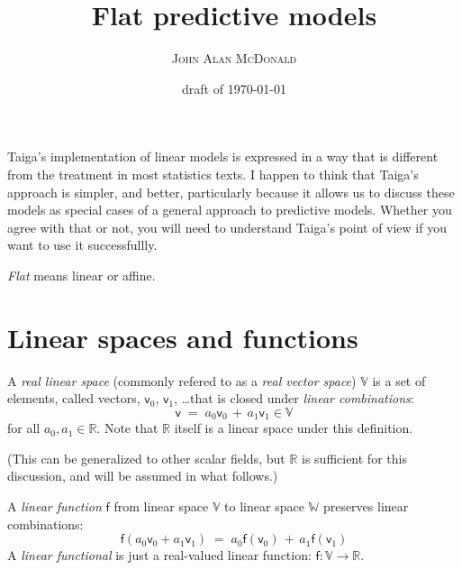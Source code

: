 



\title{Flat predictive models}
\author{\textsc{John Alan McDonald }}
\date{draft of \today}

\maketitle

Taiga's implementation of linear models is expressed in a way
that is different from the treatment in most statistics texts.
I happen to think that Taiga's approach is simpler, and better, 
particularly because it allows us to discuss these models as
special cases of a general approach to predictive models.
Whether you agree with that or not, you will need to understand
Taiga's point of view if you want to use it successfullly.

\textit{Flat} means linear or affine.

\section{\label{sec:Linear} Linear spaces and functions}

A \textit{real linear space} 
(commonly refered to as a
\textit{real vector space}) 
\(\mathbb{V}\) is a set of elements, called vectors,
\(\mathsf{v}_0\), \(\mathsf{v}_1\), \ldots that is closed under 
\textit{linear combinations}:
\begin{equation}
\mathsf{v} \; = \; a_0 \mathsf{v}_0 \, + \, a_1 \mathsf{v}_1 
\in \mathbb{V}
\end{equation}
for all \(a_0, a_1 \in \mathbb{R}\).
Note that \(\mathbb{R}\) itself is a linear space under this
definition.

(This can be generalized to other scalar fields,
but \(\mathbb{R}\) is sufficient for this discussion,
and will be assumed in what follows.)

A \textit{linear function} \(\mathsf{f}\) from linear space
\(\mathbb{V}\) to linear space \(\mathbb{W}\) 
preserves linear combinations:
\begin{equation}
\mathsf{f}(a_0 \mathsf{v}_0 + a_1 \mathsf{v}_1 ) 
\; = \;
a_0 \mathsf{f}(\mathsf{v}_0) \, + \, 
a_1 \mathsf{f}(\mathsf{v}_1)
\end{equation}
A \textit{linear functional} is just a real-valued linear
function: \(\mathsf{f} : \mathbb{V} \rightarrow \mathbb{R}\).

